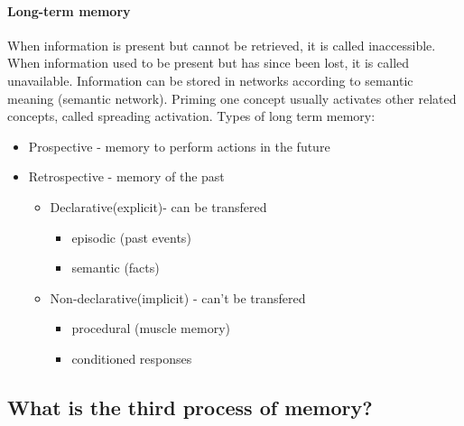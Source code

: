 \documentclass[10pt,letter]{article}
\theoremstyle{plain}
\theoremstyle{definition}
\begin{document}
\paragraph{Long-term memory}
When information is present but cannot be retrieved, it is called inaccessible. When information used to be present but has since been lost, it is called unavailable. Information can be stored in networks according to semantic meaning (semantic network). Priming one concept usually activates other related concepts, called spreading activation. Types of long term memory: 
\begin{itemize}
    \item Prospective - memory to perform actions in the future
    \item Retrospective - memory of the past
    \begin{itemize}
        \item Declarative(explicit)- can be transfered 
        \begin{itemize}
            \item episodic (past events)
            \item semantic (facts)
        \end{itemize}
        \item Non-declarative(implicit) - can't be transfered
        \begin{itemize}
            \item procedural (muscle memory)
            \item conditioned responses
        \end{itemize}
    \end{itemize}
\end{itemize}

\subsection*{What is the third process of memory?}
\end{document}
